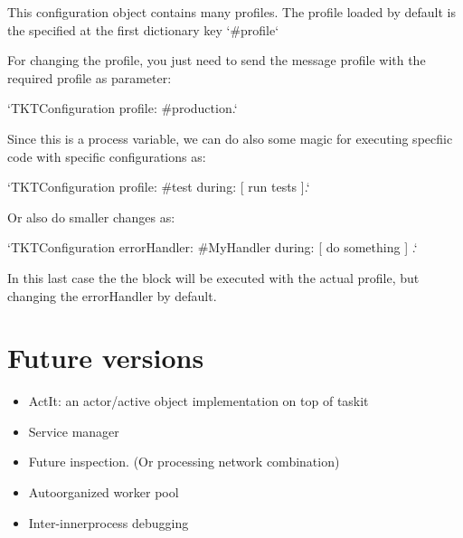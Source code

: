 \documentclass[10pt,twoside,english]{_support/latex/sbabook/sbabook}
\begin{document}
This configuration object contains many profiles. 
The profile loaded by default is the specified at the first dictionary key `\#profile`

For changing the profile, you just need to send the message profile with the required profile as parameter:

`TKTConfiguration profile: \#production.`

Since this is a process variable, we can do also some magic for executing specfiic code with specific configurations as:

`TKTConfiguration profile: \#test during: {[} run tests {]}.`

Or also do smaller changes as:

`TKTConfiguration errorHandler: \#MyHandler during: {[} do something {]} .`

In this last case the the block will be executed with the actual profile, but changing the errorHandler by default. 
\chapter{Future versions}
\begin{itemize}
\item ActIt: an actor/active object implementation on top of taskit
\item Service manager
\item Future inspection. (Or processing network combination) 
\item Autoorganized worker pool
\item Inter-innerprocess debugging
\end{itemize}






\backmatter

\end{document}
